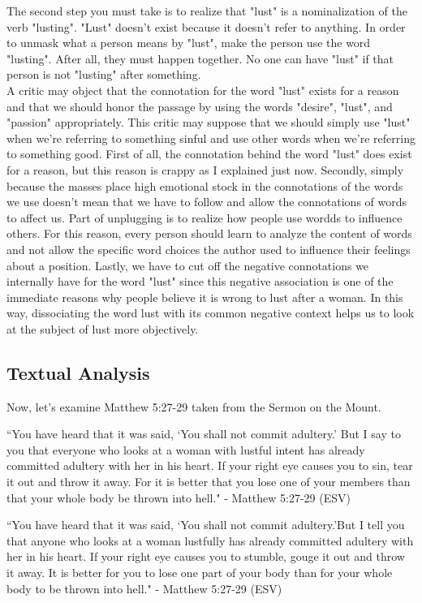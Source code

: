 \documentclass[a4paper, parskip=full, 12pt]{article}
\begin{document}
\break
The second step you must take is to realize that "lust" is a nominalization of the verb "lusting". "Lust" doesn't exist because it doesn't refer to anything. In order to unmask what a person means by "lust", make the person use the word "lusting". After all, they must happen together. No one can have "lust" if that person is not "lusting" after something. \\
\break
A critic may object that the connotation for the word "lust" exists for a reason and that we should honor the passage by using the words "desire", "lust", and "passion" appropriately. This critic may suppose that we should simply use "lust" when we're referring to something sinful and use other words when we're referring to something good. First of all, the connotation behind the word "lust" does exist for a reason, but this reason is crappy as I explained just now. Secondly, simply because the masses place high emotional stock in the connotations of the words we use doesn't mean that we have to follow and allow the connotations of words to affect us. Part of unplugging is to realize how people use wordds to influence others. For this reason, every person should learn to analyze the content of words and not allow the specific word choices the author used to influence their feelings about a position. Lastly, we have to cut off the negative connotations we internally have for the word "lust" since this negative association is one of the immediate reasons why people believe it is wrong to lust after a woman. In this way, dissociating the word lust with its common negative context helps us to look at the subject of lust more objectively. \\
\subsection{Textual Analysis}

Now, let's examine Matthew 5:27-29 taken from the Sermon on the Mount.

“You have heard that it was said, ‘You shall not commit adultery.’ But I say to you that everyone who looks at a woman with lustful intent has already committed adultery with her in his heart. If your right eye causes you to sin, tear it out and throw it away. For it is better that you lose one of your members than that your whole body be thrown into hell." - Matthew 5:27-29 (ESV)

“You have heard that it was said, ‘You shall not commit adultery.’But I tell you that anyone who looks at a woman lustfully has already committed adultery with her in his heart. If your right eye causes you to stumble, gouge it out and throw it away. It is better for you to lose one part of your body than for your whole body to be thrown into hell." - Matthew 5:27-29 (ESV)
\end{document}
